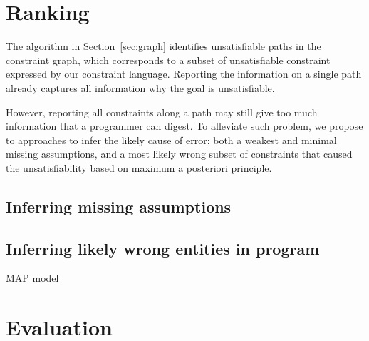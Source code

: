 
% 
% 
% 
% 
% 
% 
\section{Ranking}
\label{sec:ranking}

The algorithm in Section~\ref{sec:graph} identifies unsatisfiable paths in the
constraint graph, which corresponds to a subset of unsatisfiable constraint
expressed by our constraint language. Reporting the information on a single
path already captures all information why the goal is unsatisfiable.

However, reporting all constraints along a path may still give too much
information that a programmer can digest. To alleviate such problem, we propose
to approaches to infer the likely cause of error: both a weakest and minimal
missing assumptions, and a most likely wrong subset of constraints that caused
the unsatisfiability based on maximum a posteriori principle.
 

\subsection{Inferring missing assumptions}
\label{sec:assumptions}

\subsection{Inferring likely wrong entities in program}

MAP model

\section{Evaluation}
\label{sec:evaluation}

